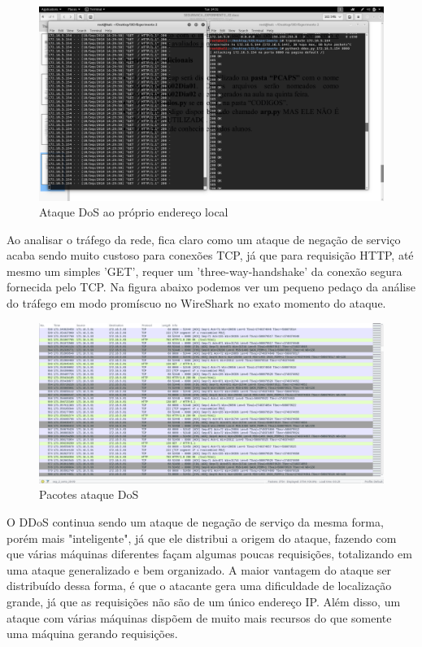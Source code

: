 \documentclass[journal]{IEEEtran}
\begin{document}
\begin{figure}[h!]
	\includegraphics[width=\linewidth]{../fotos_experimento_2/atacandoLocalhost.png}
	\caption{Ataque DoS ao próprio endereço local}
	\label{fig:Ataque_a_si}
\end{figure}

Ao analisar o tráfego da rede, fica claro como um ataque de negação de serviço acaba sendo muito custoso para conexões TCP, já que para requisição HTTP, até mesmo um simples 'GET', requer um 'three-way-handshake' da conexão segura fornecida pelo TCP. Na figura abaixo podemos ver um pequeno pedaço da análise do tráfego em modo promíscuo no WireShark no exato momento do ataque.

\begin{figure}[h!]
	\includegraphics[width=\linewidth]{../fotos_experimento_2/pacotes_DoS_TCP_HTTP.png}
	\caption{Pacotes ataque DoS}
	\label{fig:Pacotes_ataque}
\end{figure}

O DDoS continua sendo um ataque de negação de serviço da mesma forma, porém mais "inteligente", já que ele distribui a origem do ataque, fazendo com que várias máquinas diferentes façam algumas poucas requisições, totalizando em uma ataque generalizado e bem organizado. A maior vantagem do ataque ser distribuído dessa forma, é que o atacante gera uma dificuldade de localização grande, já que as requisições não são de um único endereço IP. Além disso, um ataque com várias máquinas dispõem de muito mais recursos do que somente uma máquina gerando requisições.
\end{document}
